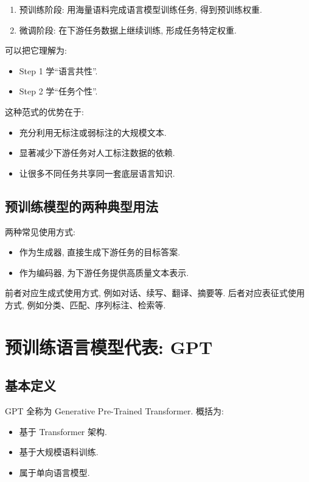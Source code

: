 \begin{enumerate}
\item[1.] 预训练阶段: 用海量语料完成语言模型训练任务, 得到预训练权重.
\item[2.] 微调阶段: 在下游任务数据上继续训练, 形成任务特定权重.
\end{enumerate}

可以把它理解为:

\begin{itemize}
\item Step 1 学“语言共性”.
\item Step 2 学“任务个性”.
\end{itemize}

这种范式的优势在于:

\begin{itemize}
\item 充分利用无标注或弱标注的大规模文本.
\item 显著减少下游任务对人工标注数据的依赖.
\item 让很多不同任务共享同一套底层语言知识.
\end{itemize}

\subsection{预训练模型的两种典型用法}


两种常见使用方式:

\begin{itemize}
\item 作为生成器, 直接生成下游任务的目标答案.
\item 作为编码器, 为下游任务提供高质量文本表示.
\end{itemize}

前者对应生成式使用方式, 例如对话、续写、翻译、摘要等.
后者对应表征式使用方式, 例如分类、匹配、序列标注、检索等.

\section{预训练语言模型代表: GPT}


\subsection{基本定义}


GPT 全称为 Generative Pre-Trained Transformer.
概括为:

\begin{itemize}
\item 基于 Transformer 架构.
\item 基于大规模语料训练.
\item 属于单向语言模型.
\end{itemize}

